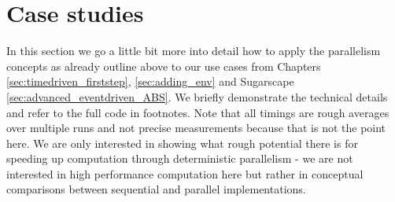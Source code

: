 \section{Case studies}
In this section we go a little bit more into detail how to apply the parallelism concepts as already outline above to our use cases from Chapters \ref{sec:timedriven_firststep}, \ref{sec:adding_env} and Sugarscape \ref{sec:advanced_eventdriven_ABS}. We briefly demonstrate the technical details and refer to the full code in footnotes. Note that all timings are rough averages over multiple runs and not precise measurements because that is not the point here. We are only interested in showing what rough potential there is for speeding up computation through deterministic parallelism - we are not interested in high performance computation here but rather in conceptual comparisons between sequential and parallel implementations.




\\
